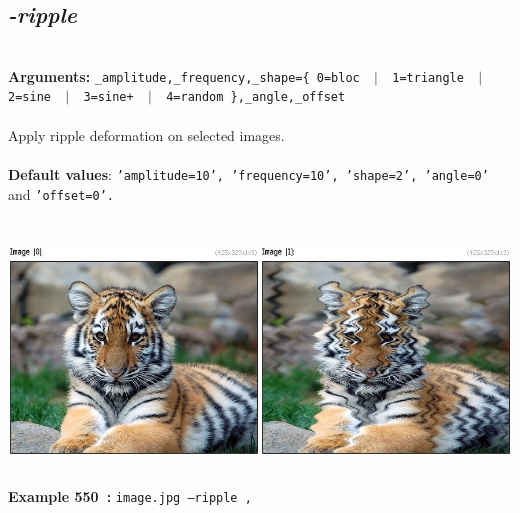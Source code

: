 \documentclass[a4paper,11pt,twoside]{book}
\begin{document}
\subsection{\emph{-ripple} }\vspace*{-0.5em}
~\\\textbf{Arguments: } 
{\small \texttt{\_amplitude,\_frequency,\_shape=\{ 0=bloc ~$|$~ 1=triangle ~$|$~ 2=sine ~$|$~ 3=sine+ ~$|$~ 4=random \},\_angle,\_offset}}\\~\\
Apply ripple deformation on selected images.
~\\~\\\textbf{Default values}: {\small \texttt{'amplitude=10', 'frequency=10', 'shape=2', 'angle=0'} and \texttt{'offset=0'.}}
\begin{center}\includegraphics[keepaspectratio=true,height=7cm,width=\textwidth]{img/gmic_def550.jpg}\\
{\footnotesize \textbf{Example 550~:} \texttt{image.jpg --ripple ,}}
\end{center}
\end{document}
